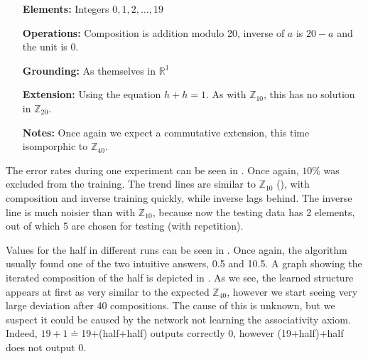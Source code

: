\begin{itemize}
	\item[\textbf{Elements:}] Integers $0,1,2,\dots,19$
	\item[\textbf{Operations:}] Composition is addition modulo 20, inverse of $a$ is $20-a$ and the unit is 0.
	\item[\textbf{Grounding:}] As themselves in $\mathbb{R}^1$
	\item[\textbf{Extension:}] Using the equation $h+h=1$. As with $\mathbb{Z}_{10}$, this has no solution in $\mathbb{Z}_{20}$.
	\item[\textbf{Notes:}] Once again we expect a commutative extension, this time isomporphic to $\mathbb{Z}_{40}$.
\end{itemize}

The error rates during one experiment can be seen in . Once again, $10\%$ was excluded from the training. The trend lines are similar to $\mathbb{Z}_{10}$ (), with composition and inverse training quickly, while inverse lags behind. The inverse line is much noisier than with $\mathbb{Z}_{10}$, because now the testing data has 2 elements, out of which 5 are chosen for testing (with repetition).

Values for the half in different runs can be seen in . Once again, the algorithm usually found one of the two intuitive answers, 0.5 and 10.5. A graph showing the iterated composition of the half is depicted in . As we see, the learned structure appears at first as very similar to the expected $\mathbb{Z}_{40}$, however we start seeing very large deviation after 40 compositions. The cause of this is unknown, but we suspect it could be caused by the network not learning the associativity axiom. Indeed, $19+1\doteq$19+(half+half) outputs correctly $0$, however (19+half)+half does not output 0.

